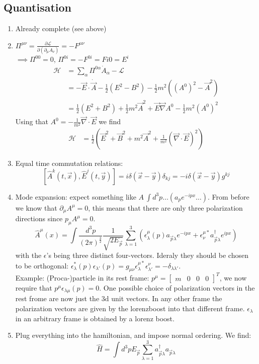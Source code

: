 \documentclass{report}
\begin{document}
\subsection{Quantisation}
\begin{enumerate}
	\item Already complete (see above)\\
	\item $\Pi^{\mu\nu} = \frac{\partial \mathcal{L}}{\partial \left( \partial_\mu A_\nu   \right) } = -F^{\mu\nu} $ \\
		$\implies \Pi^{00} = 0$, $\Pi^{0i} = - F^{0i} = F{i 0} = E^i$ 
		\begin{align*}
			\mathcal{H} &= \sum_{\alpha } \Pi^{0 \alpha} \dot{A}_\alpha - \mathcal{L} \\
				    &= -\vec{E} \cdot \dot{\vec{A}} - \frac{1}{2} \left( E^2 - B^2 \right) - \frac{1}{2} m^2 \left( \left( A^0 \right)^2 - \vec{A}^2 \right)  \\
				    &=  \frac{1}{2} \left( E^2 + B^2 \right) + \frac{1}{2} m^2 \vec{A}^2 + \vec{E} \vec{\nabla } A^0 - \frac{1}{2} m^2 \left( A^0 \right)^2
		\end{align*} Using that $A^0 = -\frac{1}{m^2} \vec{\nabla } \cdot \vec{E}$ we find 
		\begin{align*}
			\mathcal{H} &= \frac{1}{2} \left( \vec{E}^2 + \vec{B}^2 + m^2 \vec{A}^2 + \frac{1}{m^2}\left( \vec{\nabla}\cdot \vec{E} \right)^2 \right) 
		\end{align*}
	\item Equal time commutation relations: \[
			[\hat{A}^k(t,\vec{x}), \hat{E}^j (t,\vec{y}) ] = i \delta(\vec{x} - \vec{y}) \delta_{kj} = -i \delta(\vec{x}-\vec{y}) g^{kj}
	\] 
\item Mode expansion: expect something like $A ~ \int d^3p \ldots \left( a_p e^{-ipx}\ldots \right)$. From before we know that $\partial_\mu A^\mu = 0 $, this means that there are only three polarization directions since $p_\mu A^\mu = 0$. \[
		\hat{A}^\mu (x) = \int \frac{d^3p}{\left( 2 \pi \right) ^{\frac{3}{2}}} \frac{1}{\sqrt{2 E_{\vec{p}} }} \sum_{\lambda = 1}^{3} \left( \epsilon^\mu_\lambda(p) a_{\vec{p}\lambda} e^{-ipx} + \epsilon^{\mu*}_\nu a_{\vec{p}\lambda}^\dagger e^{ipx} \right) 
	\] with the $\epsilon$'s being three distinct four-vectors. Ideraly they should be chosen to be orthogonal: $\epsilon^*_\lambda(p) \epsilon_{\lambda'}(p) = g_{\mu\nu} \epsilon_\lambda^{\mu*} \epsilon_{\lambda'}^\nu = -\delta_{\lambda \lambda'}$.\\
	Example: (Proca-)particle in its rest frame: $p^\mu = \begin{bmatrix} m & 0 & 0 & 0 \end{bmatrix}^T $, we now require that $p^\mu \epsilon_{\lambda \mu}(p) = 0$. One possible choice of polarization vectors in the rest frome are now just the 3d unit vectors. In any other frame the polarization vectors are given by the lorenzboost into that different frame. $\epsilon_\lambda$ in an arbitrary frame is obtained by a lorenz boost.
\item Plug everything into the hamiltonian, and impose normal ordering. We find: \[
		\hat{H} = \int d^3p E_{\vec{p}} \sum_{\lambda =1}^{3} a_{\vec{p}\lambda}^\dagger a_{\vec{p}\lambda}
\] 
\end{enumerate}
\end{document}
